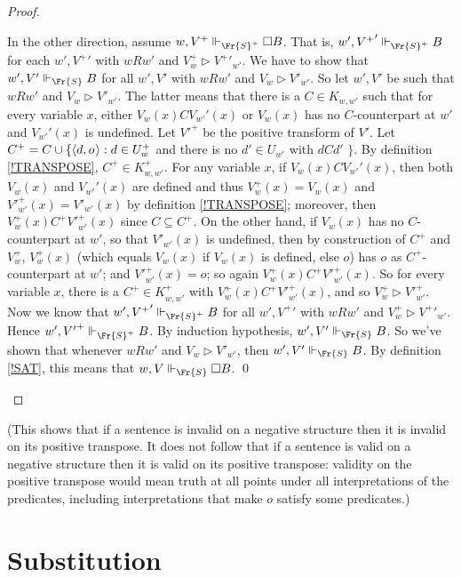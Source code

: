 \documentclass[11pt]{woarticle}
\theoremstyle{break}
\theoremstyle{nonumberplain}
\newcommand{\SAT}{\Vdash}
\newcommand{\Img}{\triangleright}
\newcommand{\1}{\;\,|\;\,}
\renewcommand{\t}[1]{\ensuremath{\langle #1  \makebox[.2ex]{}\rangle}}
\begin{document}
\begin{proof}
\begin{enumerate}
    In the other direction, assume $w, V^+ \SAT_{\Fr{S}^+} \Box
    B$. That is, $w',{V^+}' \SAT_{\Fr{S}^+} B$ for each $w',{V^+}'$
    with $wRw'$ and $V^+_w \Img {V^+}'_{w'}$. We have to show that
    $w',V' \SAT_{\Fr{S}} B$ for all $w',V'$ with $wRw'$ and $V_w\Img
    V'_{w'}$. So let $w',V'$ be such that $wRw'$ and $V_w\Img
    V'_{w'}$. The latter means that there is a $C \in K_{w,w'}$ such
    that for every variable $x$, either $V_w(x)CV_{w'}'(x)$ or
    $V_w(x)$ has no $C$-counterpart at $w'$ and $V_{w'}'(x)$ is
    undefined. Let ${V'}^+$ be the positive transform of $V'$.  Let
    $C^+ = C \cup \{ \t{d,o} : d\in U^+_{w}$ and there is no $d'\in
    U_{w'}$ with $dCd'$ $\}$. By definition \ref{!TRANSPOSE}, $C^+ \in
    K^+_{w,w'}$. For any variable $x$, if $V_w(x)CV_{w'}'(x)$, then
    both $V_w(x)$ and $V_{w'}'(x)$ are defined and thus $V_w^+(x) =
    V_w(x)$ and ${V'}^+_{w'}(x) = V'_{w'}(x)$ by definition
    \ref{!TRANSPOSE}; moreover, then $V_w^+(x)C^+{V'}^+_{w'}(x)$ since
    $C \subseteq C^+$. On the other hand, if $V_w(x)$ has no
    $C$-counterpart at $w'$, so that $V'_{w'}(x)$ is undefined, then
    by construction of $C^+$ and $V_w^+$, $V_w^+(x)$ (which equals
    $V_w(x)$ if $V_w(x)$ is defined, else $o$) has $o$ as
    $C^+$-counterpart at $w'$; and ${V'}^+_{w'}(x)=o$; so again
    $V_w^+(x)C^+{V'}^+_{w'}(x)$. So for every variable $x$, there is a
    $C^+ \in K^+_{w,w'}$ with $V_w^+(x)C^+{V'}^+_{w'}(x)$, and so
    $V^+_w \Img {V'}^+_{w'}$. Now we know that $w',{V^+}'
    \SAT_{\Fr{S}^+} B$ for all $w',{V^+}'$ with $wRw'$ and $V^+_w \Img
    {V^+}'_{w'}$. Hence $w',{V'}^+ \SAT_{\Fr{S}^+} B$. By induction
    hypothesis, $w',V' \SAT_{\Fr{S}} B$. So we've shown that whenever
    $wRw'$ and $V_w \Img V'_{w'}$, then $w',V' \SAT_{\Fr{S}} B$. By
    definition \ref{!SAT}, this means that $w,V \SAT_{\Fr{S}} \Box
    B$. \qed
  \end{enumerate}
\end{proof}

(This shows that if a sentence is invalid on a negative structure then it is
invalid on its positive transpose. It does not follow that if a sentence is
valid on a negative structure then it is valid on its positive transpose:
validity on the positive transpose would mean truth at all points under all
interpretations of the predicates, including interpretations that make $o$
satisfy some predicates.)

\section{Substitution}\label{sec:substitution}
\end{document}
